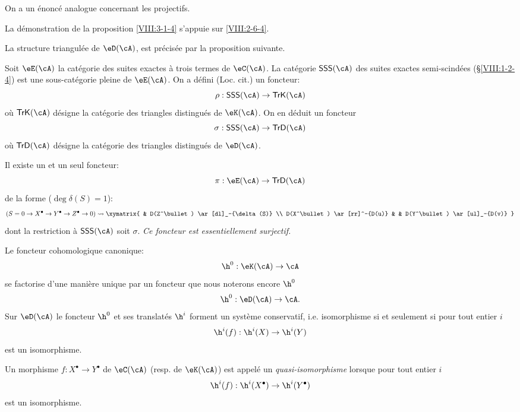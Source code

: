 On a un énoncé analogue concernant les projectifs. 

La démonstration de la proposition \ref{VIII:3-1-4} s'appuie sur 
\ref{VIII:2-6-4}. 

La structure triangulée de $\eD(\cA)$, est précisée par la proposition 
suivante. 

Soit $\eE(\cA)$ la catégorie des suites exactes à trois termes de 
$\eC(\cA)$. La catégorie $\mathsf{SSS}(\cA)$ des suites exactes 
semi-scindées (\S\ref{VIII:1-2-4}) est une sous-catégorie pleine de 
$\eE(\cA)$. On a défini (Loc. cit.) un foncteur: 
\[
  \rho:\mathsf{SSS}(\cA) \to \mathsf{TrK}(\cA) 
\]
où $\mathsf{TrK}(\cA)$ désigne la catégorie des triangles distingués 
de $\eK(\cA)$. On en déduit un foncteur 
\[
  \sigma : \mathsf{SSS}(\cA) \to \mathsf{TrD}(\cA) 
\]
où $\mathsf{TrD}(\cA)$ désigne la catégorie des triangles distingués 
de $\eD(\cA)$. 





\begin{proposition}\label{VIII:3-1-5}
Il existe un et un seul foncteur: 
\[
  \pi:\eE(\cA) \to \mathsf{TrD}(\cA) 
\]
de la forme ($\deg \delta(S)=1$): 
\[
(S=0 \to X^\bullet \to Y^\bullet \to Z^\bullet \to 0) 
\leadsto 
\xymatrix{
  & D(Z^\bullet) \ar[dl]_-{\delta(S)} \\
  D(X^\bullet) \ar[rr]^-{D(u)} 
    & & D(Y^\bullet) \ar[ul]_-{D(v)} 
}
\]
dont la restriction à $\mathsf{SSS}(\cA)$ soit $\sigma$. \emph{Ce foncteur 
est essentiellement surjectif.}
\end{proposition}





\begin{proposition}\label{VIII:3-1-6}
Le foncteur cohomologique canonique: 
\[
  \h^0:\eK(\cA) \to \cA 
\]
se factorise d'une manière unique par un foncteur que nous noterons encore 
$\h^0$ 
\[
  \h^0:\eD(\cA) \to \cA \text{.}
\]
Sur $\eD(\cA)$ le foncteur $\h^0$ et ses translatés $\h^i$ forment un 
système conservatif, i.e.  
isomorphisme si et seulement si pour tout entier $i$ 
\[
  \h^i(f):\h^i(X) \to \h^i(Y) 
\]
est un isomorphisme. 
\end{proposition}





\begin{definition}\label{VIII:3-1-7}
Un morphisme $f:X^\bullet \to Y^\bullet$ de $\eC(\cA)$ (resp. de $\eK(\cA)$) 
est appelé un \emph{quasi-isomorphisme} lorsque pour tout entier $i$ 
\[
  \h^i(f):\h^i(X^\bullet) \to \h^i(Y^\bullet) 
\]
est un isomorphisme. 
\end{definition}

